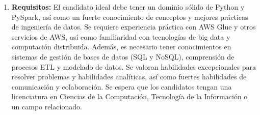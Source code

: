 \documentclass[12pt]{article}
\begin{document}
\begin{enumerate}
                    \item \textbf{Requisitos:}
                        El candidato ideal debe tener un dominio sólido de Python y PySpark, así como un fuerte conocimiento de conceptos y mejores prácticas de ingeniería de datos. Se requiere experiencia práctica con AWS Glue y otros servicios de AWS, así como familiaridad con tecnologías de big data y computación distribuida. Además, es necesario tener conocimientos en sistemas de gestión de bases de datos (SQL y NoSQL), comprensión de procesos ETL y modelado de datos. Se valoran habilidades excepcionales para resolver problemas y habilidades analíticas, así como fuertes habilidades de comunicación y colaboración. Se espera que los candidatos tengan una licenciatura en Ciencias de la Computación, Tecnología de la Información o un campo relacionado.

                \end{enumerate}
\end{document}
